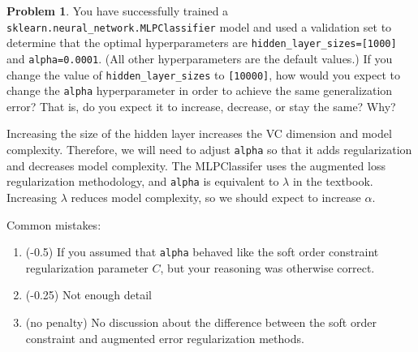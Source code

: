 \documentclass[10pt]{exam}
\theoremstyle{definition}
\newtheorem{problem}{Problem}
\begin{document}
\newpage
\begin{problem}
    You have successfully trained a \lstinline{sklearn.neural_network.MLPClassifier} model and used a validation set to determine that the optimal hyperparameters are \lstinline{hidden_layer_sizes=[1000]} and \lstinline{alpha=0.0001}.
    (All other hyperparameters are the default values.)
    If you change the value of \lstinline{hidden_layer_sizes} to \lstinline{[10000]}, how would you expect to change the \lstinline{alpha} hyperparameter in order to achieve the same generalization error?
    That is, do you expect it to increase, decrease, or stay the same?
    Why?
\end{problem}
\begin{solution}
    Increasing the size of the hidden layer increases the VC dimension and model complexity.
    Therefore, we will need to adjust \lstinline{alpha} so that it adds regularization and decreases model complexity.
    The MLPClassifer uses the augmented loss regularization methodology, and \lstinline{alpha} is equivalent to $\lambda$ in the textbook.
    Increasing $\lambda$ reduces model complexity,
    so we should expect to increase $\alpha$.

    \vspace{0.2in}
    \noindent
    Common mistakes:
    \begin{enumerate}
        \item (-0.5) If you assumed that \lstinline{alpha} behaved like the soft order constraint regularization parameter $C$, but your reasoning was otherwise correct.
        \item (-0.25) Not enough detail
        \item (no penalty) No discussion about the difference between the soft order constraint and augmented error regularization methods.
    \end{enumerate}
\end{solution}
\end{document}

